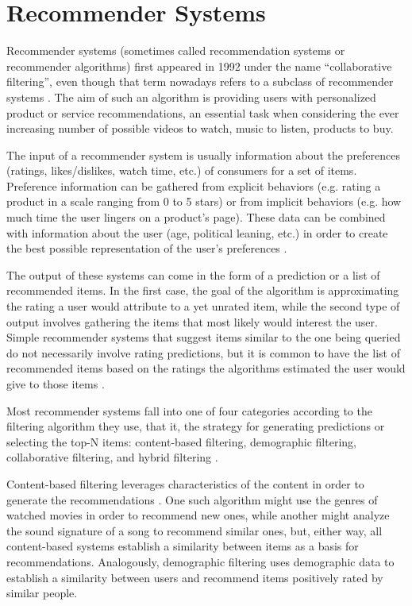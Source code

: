 \section{Recommender Systems}
\label{sec:recommender_systems}

Recommender systems (sometimes called recommendation systems or recommender
algorithms) first appeared in 1992 under the name ``collaborative filtering'',
even though that term nowadays refers to a subclass of recommender systems
\citep{goldberg_using_1992}. The aim of such an algorithm is providing users
with personalized product or service recommendations, an essential task when
considering the ever increasing number of possible videos to watch, music to
listen, products to buy.

The input of a recommender system is usually information about the preferences
(ratings, likes/dislikes, watch time, etc.) of consumers for a set of items.
Preference information can be gathered from explicit behaviors (e.g. rating a
product in a scale ranging from 0 to 5 stars) or from implicit behaviors (e.g.
how much time the user lingers on a product's page). These data can be combined
with information about the user (age, political leaning, etc.) in order to
create the best possible representation of the user's preferences \citep{}.

The output of these systems can come in the form of a prediction or a list of
recommended items. In the first case, the goal of the algorithm is approximating
the rating a user would attribute to a yet unrated item, while the second type
of output involves gathering the items that most likely would interest the user.
Simple recommender systems that suggest items similar to the one being queried
do not necessarily involve rating predictions, but it is common to have the list
of recommended items based on the ratings the algorithms estimated the user would
give to those items \citep{}.

Most recommender systems fall into one of four categories according to the
filtering algorithm they use, that it, the strategy for generating predictions
or selecting the top-N items: content-based filtering, demographic filtering,
collaborative filtering, and hybrid filtering \citep{}.

Content-based filtering leverages characteristics of the content in order to
generate the recommendations \citep{ricci_introduction_2011}. One such algorithm
might use the genres of watched movies in order to recommend new ones, while
another might analyze the sound signature of a song to recommend similar ones,
but, either way, all content-based systems establish a similarity between items
as a basis for recommendations. Analogously, demographic filtering uses
demographic data to establish a similarity between users and recommend items
positively rated by similar people.

